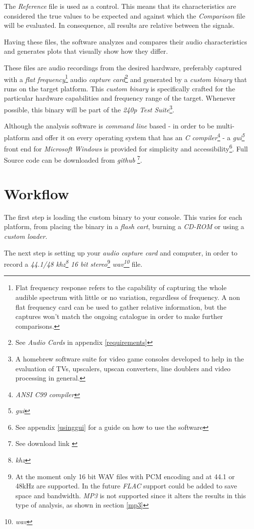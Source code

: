 \documentclass[10pt,a4paper]{report}
\newcommand{\define}[1]{
	\textit{\acrshort{#1}\footnote{\textit{\acrlong{#1}}}}}
\begin{document}
The \textit{Reference} file is used as a control. This means that its characteristics are considered the true values to be expected and against which the \textit{Comparison} file will be evaluated. In consequence, all results are relative between the signals.

Having these files, the software analyzes and compares their audio characteristics and generates plots that visually show how they differ.

These files are audio recordings from the desired hardware, preferably captured with a \textit{flat frequency}\footnote{Flat frequency response refers to the capability of capturing the whole audible spectrum with little or no variation, regardless of frequency. A non flat frequency card can be used to gather relative information, but the captures won't match the ongoing catalogue in order to make further comparisons.} audio \textit{capture card}\footnote{See \textit{Audio Cards} in appendix \ref{requirements}} and generated by a \textit{custom binary} that runs on the target platform. This \textit{custom binary} is specifically crafted for the particular hardware capabilities and frequency range of the target. Whenever possible, this binary will be part of the \textit{240p Test Suite}\footnote{A homebrew software suite for video game consoles developed to help in the evaluation of TVs, upscalers, upscan converters, line doublers and video processing in general.\cite{240pSuite}}. 


Although the analysis software is \textit{command line} based - in order to be multi-platform and offer it on every operating system that has an \textit{C compiler}\footnote{\textit{ANSI C99 compiler}} - a \define{gui} front end for \textit{Microsoft Windows} is provided for simplicity and accessibility\footnote{See appendix \ref{usinggui} for a guide on how to use the software}. Full Source code can be downloaded from \textit{github} \footnote{See download link \cite{sourcecode}}.

\section{Workflow}
\label{workflow}

The first step is loading the custom binary to your console. This varies for each platform, from placing the binary in a \textit{flash cart}, burning a \textit{CD-ROM} or using a \textit{custom loader}.

The next step is setting up your \textit{audio capture card} and computer, in order to record a \textit{44.1/48\define{khz} 16 bit stereo}\footnote{At the moment only 16 bit WAV files with PCM encoding and at 44.1 or 48kHz are supported. In the future \textit{FLAC} support could be added to save space and bandwidth. \textit{MP3} is not supported since it alters the results in this type of analysis, as shown in section \ref{mp3}} \define{wav} file.
\end{document}
